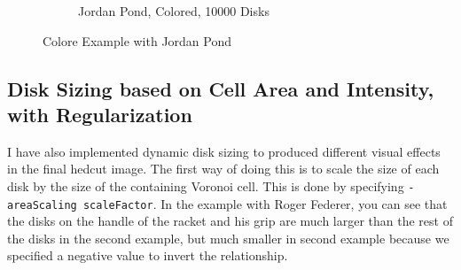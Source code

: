 \documentclass[11pt]{article}
\begin{document}
\begin{figure}[H]
\begin{subfigure}[b]{.48\linewidth}
		\caption{Jordan Pond, Colored, 10000 Disks}
		\label{fig:jordanPondColor}
	\end{subfigure}
	\caption{Colore Example with Jordan Pond}
	\label{fig:jordanPondExample}
\end{figure}


\subsection{Disk Sizing based on Cell Area and Intensity, with Regularization}

I have also implemented dynamic disk sizing to produced different visual effects in the final hedcut image. The first way of doing this is to scale the size of each disk by the size of the containing Voronoi cell. This is done by specifying \verb|-areaScaling scaleFactor|. In the example with Roger Federer, you can see that the disks on the handle of the racket and his grip are much larger than the rest of the disks in the second example, but much smaller in second example because we specified a negative value to invert the relationship.
\end{document}
